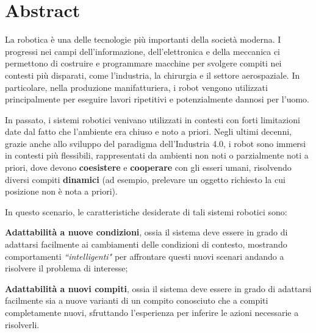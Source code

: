 \chapter*{Abstract}
\label{ch:abstract}
La robotica è una delle tecnologie più importanti della società moderna. I progressi nei campi dell'informazione, dell'elettronica e della meccanica ci permettono di costruire e programmare macchine per svolgere compiti nei contesti più disparati, come l'industria, la chirurgia e il settore aerospaziale.
\newline In particolare, nella produzione manifatturiera, i robot vengono utilizzati principalmente per eseguire lavori ripetitivi e potenzialmente dannosi per l'uomo.

In passato, i sistemi robotici venivano utilizzati in contesti con forti limitazioni date dal fatto che l'ambiente era chiuso e noto a priori. Negli ultimi decenni, grazie anche allo sviluppo del paradigma dell'Industria 4.0, i robot sono immersi in contesti più flessibili, rappresentati da ambienti non noti o parzialmente noti a priori, dove devono \textbf{coesistere} e \textbf{cooperare} con gli esseri umani, risolvendo diversi compiti \textbf{dinamici} \cite{bini2023multi} (ad esempio, prelevare un oggetto richiesto la cui posizione non è nota a priori).

In questo scenario, le caratteristiche desiderate di tali sistemi robotici sono:
\begin{enumerate*}[label=\textbf{(\alph*)}]
\item \textbf{Adattabilità a nuove condizioni}, ossia il sistema deve essere in grado di adattarsi facilmente ai cambiamenti delle condizioni di contesto, mostrando comportamenti \textit{``intelligenti"} per affrontare questi nuovi scenari andando a risolvere il problema di interesse;
\item \textbf{Adattabilità a nuovi compiti}, ossia il sistema deve essere in grado di adattarsi facilmente sia a nuove varianti di un compito conosciuto che a compiti completamente nuovi, sfruttando l'esperienza per inferire le azioni necessarie a risolverli.
\end{enumerate*}


